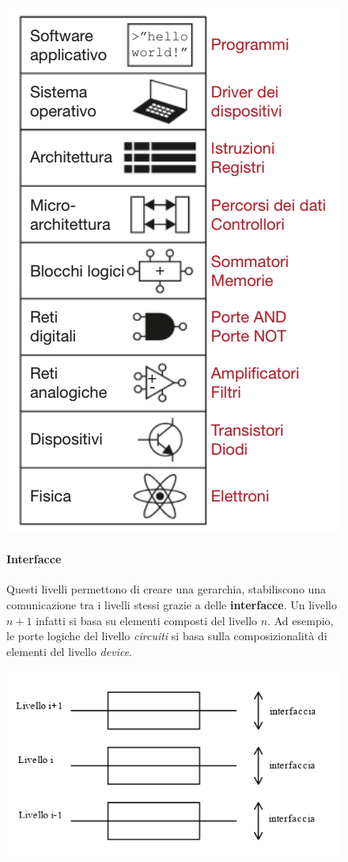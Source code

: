 \documentclass{article}
\begin{document}
\begin{figure}[htbp]
    \center
    \includegraphics[scale=0.6]{img/livelliAstrazione.png}
    \paragraph{Interfacce}
Questi livelli permettono di creare una gerarchia, stabiliscono una comunicazione tra i livelli stessi grazie a delle \textbf{interfacce}. Un livello $n+1$ infatti si basa su elementi composti del livello $n$. Ad esempio, le porte logiche del livello \textit{circuiti} si basa sulla composizionalità di elementi del livello \textit{device}.
\end{figure}


\begin{figure}[htbp]
    \center
    \includegraphics[scale=0.55]{img/interfaccia.png}
\end{figure}
\end{document}
